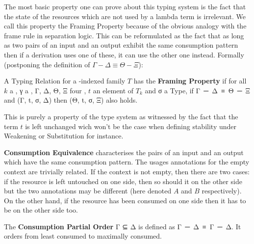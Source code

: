 The most basic property one can prove about this typing system is
the fact that the state of the resources which are not used by a
lambda term is irrelevant. We call this property the Framing
Property because of the obvious analogy with the frame rule in
separation logic. This can be reformulated as the fact that as
long as two pairs of an input and an output \Usages{} exhibit the
same consumption pattern then if a derivation uses one of these,
it can use the other one instead. Formally (postponing the
definition of $Γ - Δ ≡ Θ - Ξ$):

\begin{definition}A Typing Relation \TR{\cdot{}} for a \Nat{}-indexed
family $T$ has the \textbf{Framing Property} if for all $k$ a \Nat{},
γ a , Γ, Δ, Θ, Ξ four , $t$ an element
of $T_k$ and σ a Type, if \mbox{Γ ─ Δ ≡ Θ ─ Ξ} and (Γ, t, σ, Δ)
then (Θ, t, σ, Ξ) also holds.
\end{definition}

\begin{remark}This is purely a property of the type system as
witnessed by the fact that the term $t$ is left unchanged wich
won't be the case when defining stability under Weakening or
Substitution for instance.
\end{remark}


\begin{definition}
\label{definition:differences}
\textbf{Consumption Equivalence} characterises the pairs of an input and
an output \Usages{} which have the same consumption pattern. The
usages annotations for the empty context are trivially related.
If the context is not empty, then there are two cases: if the
resource is left untouched on one side, then so should it on the other
side but the two annotations may be different (here denoted $A$ and $B$
respectively). On the other hand, if the resource has been consumed
on one side then it has to be on the other side too.
\end{definition}

\begin{definition}The \textbf{Consumption Partial Order} Γ ⊆ Δ is defined as
\mbox{Γ ─ Δ ≡ Γ ─ Δ}. It orders \Usages{} from least consumed to maximally consumed.
\end{definition}

